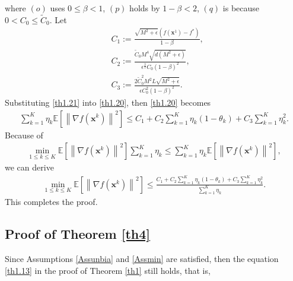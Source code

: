\documentclass[twoside,11pt]{article}
\begin{document}
where $(o)$ uses $0\le\beta<1$, $(p)$ holds by $1-\beta<2$, $(q)$ is because $0<C_0\le\tilde{C}_0$. Let
\begin{align}
   	&C_1:=\frac{\sqrt{M^2+\epsilon}\left( f(\mathbf{x}^1)-f^*\right) }{1-\beta},\nonumber\\
   	&C_2:=\frac{\tilde{C}_0 M^4\sqrt{d(M^2+\epsilon)}}{\epsilon^{\frac{3}{2}}C_0(1-\beta)^2},\nonumber\\
   	&C_3:=\frac{2\tilde{C}_0^2 M^2L\sqrt{M^2+\epsilon}}{\epsilon C_0^2(1-\beta)^2}.\nonumber
\end{align}
Substituting \eqref{th1.21} into \eqref{th1.20}, then \eqref{th1.20} becomes
\begin{equation}\label{th1.13}
   	\begin{aligned}
   	\sum_{k=1}^{K}\eta_k\mathbb{E}\left[\left\| \nabla f(\mathbf{x}^k)\right\|^2\right]
   	\le C_1
   	+C_2\sum_{k=1}^{K}\eta_k(1-\theta_k)+C_3 \sum_{k=1}^{K}\eta_{k}^2.
   	\end{aligned}
\end{equation}
Because of
\begin{equation}
   	\begin{aligned}
   	\min_{1\le k\le K}\mathbb{E}\left[\left\| \nabla f(\mathbf{x}^k)\right\|^2\right]\sum_{k=1}^{K}\eta_{k}\le\sum_{k=1}^{K}\eta_k\mathbb{E}\left[\left\| \nabla f(\mathbf{x}^k)\right\|^2\right],\nonumber
   	\end{aligned}
\end{equation}
we can derive
\begin{equation}\label{th1.16}
   	\begin{aligned}
   	\min_{1\le k\le K}\mathbb{E}\left[\left\| \nabla f(\mathbf{x}^k)\right\|^2\right]
   	\le \frac{C_1
   		+C_2\sum_{k=1}^{K}\eta_k(1-\theta_k)+C_3 \sum_{k=1}^{K}\eta_{k}^2}{\sum_{k=1}^{K}\eta_{k}}.\nonumber
   	\end{aligned}
\end{equation}
This completes the proof. 

\subsection{Proof of Theorem \ref{th4}}\label{Proof of th4}
Since Assumptions \ref{Assunbia} and \ref{Assmin} are satisfied, then the equation \eqref{th1.13} in the proof of Theorem \ref{th1} still holds,  that is, 
\end{document}
